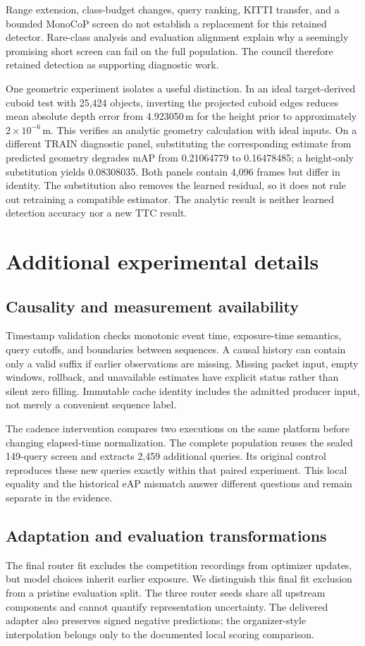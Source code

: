 \documentclass[twocolumn,letterpaper]{article}
\begin{document}
Range extension, class-budget changes, query ranking, KITTI transfer, and a bounded MonoCoP screen do not establish a replacement for this retained detector. Rare-class analysis and evaluation alignment explain why a seemingly promising short screen can fail on the full population. The council therefore retained detection as supporting diagnostic work.

One geometric experiment isolates a useful distinction. In an ideal target-derived cuboid test with 25,424 objects, inverting the projected cuboid edges reduces mean absolute depth error from 4.923050\,m for the height prior to approximately $2\times10^{-6}$\,m. This verifies an analytic geometry calculation with ideal inputs. On a different TRAIN diagnostic panel, substituting the corresponding estimate from predicted geometry degrades mAP from 0.21064779 to 0.16478485; a height-only substitution yields 0.08308035. Both panels contain 4,096 frames but differ in identity. The substitution also removes the learned residual, so it does not rule out retraining a compatible estimator. The analytic result is neither learned detection accuracy nor a new TTC result.

\section{Additional experimental details}
\subsection{Causality and measurement availability}
Timestamp validation checks monotonic event time, exposure-time semantics, query cutoffs, and boundaries between sequences. A causal history can contain only a valid suffix if earlier observations are missing. Missing packet input, empty windows, rollback, and unavailable estimates have explicit status rather than silent zero filling. Immutable cache identity includes the admitted producer input, not merely a convenient sequence label.

The cadence intervention compares two executions on the same platform before changing elapsed-time normalization. The complete population reuses the sealed 149-query screen and extracts 2,459 additional queries. Its original control reproduces these new queries exactly within that paired experiment. This local equality and the historical eAP mismatch answer different questions and remain separate in the evidence.

\subsection{Adaptation and evaluation transformations}
The final router fit excludes the competition recordings from optimizer updates, but model choices inherit earlier exposure. We distinguish this final fit exclusion from a pristine evaluation split. The three router seeds share all upstream components and cannot quantify representation uncertainty. The delivered adapter also preserves signed negative predictions; the organizer-style interpolation belongs only to the documented local scoring comparison.
\end{document}
